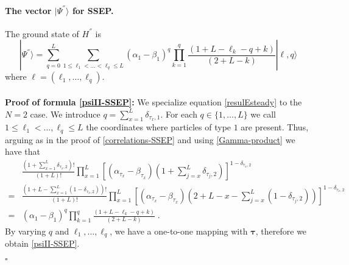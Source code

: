\documentclass[10pt]{article}
\numberwithin{equation}{section}
\numberwithin{equation}{subsection}
\newcommand{\dt}{\;.}
\begin{document}
\paragraph{The vector $|\Psi^{''}\rangle$ for SSEP.} The ground state of $H^{''}$ is 
\begin{equation}\label{psiII-SSEP}
	|\Psi^{''}\rangle=\sum_{q=0}^{L}\sum_{1\leq \ell_{1}<\ldots<\ell_{q}\leq L}(\alpha_{1}-\beta_{1})^{q}\prod_{k=1}^{q}\frac{\left(1+L-\ell_{k}-q+k\right)}{(2+L-k)}|\bm{\ell},q\rangle
\end{equation}
where $\bm{\ell}=(\ell_{1},\ldots,\ell_{q})$. \\ \\
\textbf{Proof of formula \eqref{psiII-SSEP}:} We specialize equation \eqref{resulEsteady} to the {\color{blue} $N=2$ case}. We introduce $q=\sum_{x=1}^{L}\delta_{\tau_{x},1}$. For each $q\in \{1,\ldots,L\}$ we call $1\leq\ell_{1}<\ldots,\ell_{q}\leq L$ the coordinates where particles of type $1$ are present. Thus, arguing as in the proof of \eqref{correlations-SSEP} and using \eqref{Gamma-product} we have that 
\begin{align}
	&\frac{\left(1+\sum_{x=1}^{L}\delta_{\tau_{x},2}\right)!}{\left(1+L\right)!}\prod_{x=1}^{L}\left[(\alpha_{\tau_{x}}-\beta_{\tau_{x}})\left(1+\sum_{j=x}^{L}\delta_{\tau_{j},2}\right)\right]^{1-\delta_{\tau_{x},2}}\nonumber\\%
	=&\frac{\left(1+L-\sum_{x=1}^{L}(1-\delta_{\tau_{x},2})\right)!}{\left(1+L\right)!}\prod_{x=1}^{L}\left[(\alpha_{\tau_{x}}-\beta_{\tau_{x}})\left(2+L-x-\sum_{j=x}^{L}(1-\delta_{\tau_{j},2})\right)\right]^{1-\delta_{\tau_{x},2}}\nonumber\\
	=&(\alpha_{1}-\beta_{1})^{q}\prod_{k=1}^{q}\frac{\left(1+L-\ell_{k}-q+k\right)}{(2+L-k)}\dt
\end{align}
By varying $q$ and $\ell_{1},\ldots,\ell_{q}$, we have a one-to-one mapping with $\bm{\tau}$, therefore we obtain \eqref{psiII-SSEP}.
\begin{flushright}
	$\square$
\end{flushright}
\end{document}

